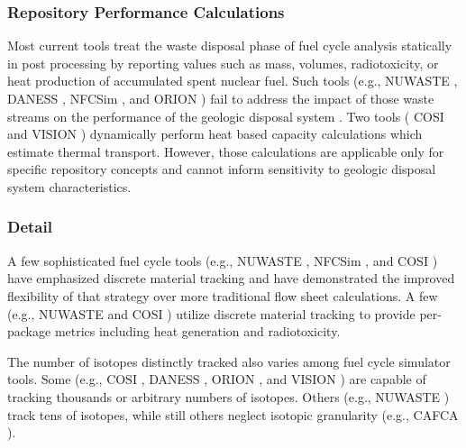 \subsubsection{Repository Performance Calculations}

Most current tools treat the waste disposal 
phase of fuel cycle analysis statically in post processing by reporting 
values such as mass, volumes, radiotoxicity, or heat production of accumulated 
spent nuclear fuel. Such tools 
(e.g.,
\gls{NUWASTE} \cite{abkowitz_nuclear_2010},
\gls{DANESS} \cite{yacout_daness_2011,van_den_durpel_daness:_2006}, 
\gls{NFCSim} \cite{schneider_nfcsim_2004}, and
ORION \cite{gregg_orion_2011}
) 
fail to address the impact of those waste streams on the performance of the 
geologic disposal system \cite{wilson_comparing_2011}.  Two tools (
\gls{COSI} \cite{boucher_international_2010} 
and 
\gls{VISION} \cite{yacout_vision_2006, wilson_comparing_2011, radel_repository_2007, boucher_international_2010}
) dynamically perform heat based capacity calculations which estimate thermal 
transport. However, those calculations are applicable only for specific 
repository concepts and cannot inform sensitivity to geologic disposal system characteristics.  

\subsubsection{Detail}

A few sophisticated fuel cycle tools  (e.g.,
\gls{NUWASTE} \cite{abkowitz_nuclear_2010},
\gls{NFCSim} \cite{schneider_nfcsim_2004}, and 
\gls{COSI} \cite{boucher_international_2010}) have emphasized discrete material 
tracking and have demonstrated the improved flexibility of that strategy over more 
traditional flow sheet calculations. A few (e.g., 
\gls{NUWASTE} \cite{abkowitz_nuclear_2010} and
\gls{COSI} \cite{boucher_international_2010}
) utilize discrete material tracking to 
provide per-package metrics including heat generation and radiotoxicity. 


The number of isotopes distinctly tracked also varies among fuel cycle 
simulator tools. Some (e.g., 
\gls{COSI} \cite{boucher_international_2010},
\gls{DANESS} \cite{yacout_daness_2011,van_den_durpel_daness:_2006}, 
ORION \cite{gregg_orion_2011}, and
\gls{VISION} \cite{yacout_vision_2006, wilson_comparing_2011, radel_repository_2007, boucher_international_2010}
) are capable of tracking thousands or arbitrary numbers of isotopes. Others (e.g., 
\gls{NUWASTE} \cite{abkowitz_nuclear_2010}) track tens of isotopes, while still 
others neglect isotopic granularity (e.g., 
\gls{CAFCA} \cite{guerin_impact_2009}).


